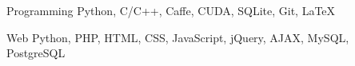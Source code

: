 

\begin{cvskills}

  \cvskill
    {Programming} %
    {Python, C/C++, Caffe, CUDA, SQLite, Git, \LaTeX} %

  \cvskill
    {Web} %
    {Python, PHP, HTML, CSS, JavaScript, jQuery, AJAX, MySQL, PostgreSQL} %

\end{cvskills}
